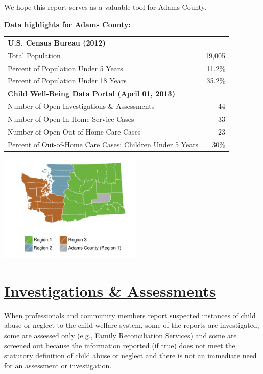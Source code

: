 \documentclass{article}\usepackage[]{graphicx}\usepackage[]{color}
\begin{document}
We hope this report serves as a valuable tool for  Adams County.

\begin{minipage}{0.6\textwidth}
\textbf{Data highlights for Adams County:}

\begin{tabular}{lr}
  \toprule
 \textbf{U.S. Census Bureau (2012)} &  \\ 
  \quad Total Population & 19,005 \\ 
  \quad Percent of Population Under 5 Years & 11.2\% \\ 
  \quad Percent of Population Under 18 Years & 35.2\% \\ 
  \textbf{Child Well-Being Data Portal (April 01, 2013)} &  \\ 
  \quad Number of Open Investigations \& Assessments & 44 \\ 
  \quad Number of Open In-Home Service Cases & 33 \\ 
  \quad Number of Open Out-of-Home Care Cases & 23 \\ 
  \quad Percent of Out-of-Home Care Cases: Children Under 5 Years & 30\% \\ 
   \bottomrule
\end{tabular}



\end{minipage}
\begin{minipage}{0.4\textwidth}

\begin{center}
\includegraphics[width=2.7in]{county_maps/Adams-b}
\end{center}

\end{minipage}


\newpage
\restoregeometry
\section{\href{http://www.partnersforourchildren.org//child-well-being/visualizations/investigations-assessments/trends}
{Investigations \& Assessments}}
When professionals and community members report suspected instances of child abuse or neglect to the child welfare system, some of the reports are investigated, some are assessed only (e.g., Family Reconciliation Services) and some are screened out because the information reported (if true) does not meet the statutory definition of child abuse or neglect and there is not an immediate need for an assessment or investigation.\\[6pt]
\label{p:ia}
\end{document}
